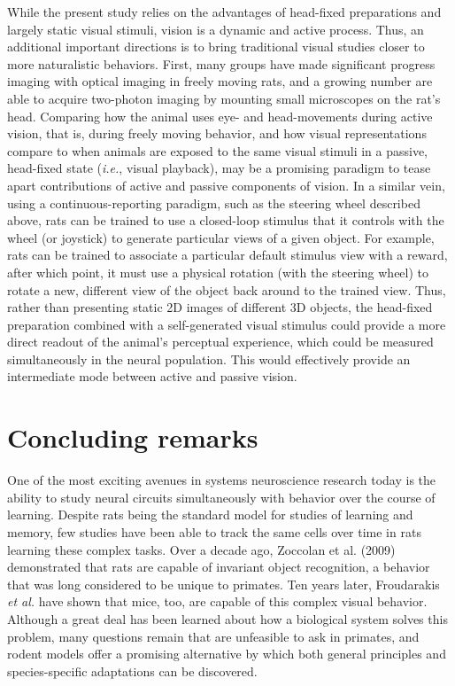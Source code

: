 While the present study relies on the advantages of head-fixed preparations and largely static visual stimuli, vision is a dynamic and active process. Thus, an additional important directions is to bring traditional visual studies closer to more naturalistic behaviors. First, many groups have made significant progress imaging with optical imaging in freely moving rats, and a growing number are able to acquire two-photon imaging by mounting small microscopes on the rat's head. Comparing how the animal uses eye- and head-movements during active vision, that is, during freely moving behavior, and how visual representations compare to when animals are exposed to the same visual stimuli in a passive, head-fixed state (\textit{i.e.}, visual playback), may be a promising paradigm to tease apart contributions of active and passive components of vision. In a similar vein, using a continuous-reporting paradigm, such as the steering wheel described above, rats can be trained to use a closed-loop stimulus that it controls with the wheel (or joystick) to generate particular views of a given object. For example, rats can be trained to associate a particular default stimulus view with a reward, after which point, it must use a physical rotation (with the steering wheel) to rotate a new, different view of the object back around to the trained view. Thus, rather than presenting static 2D images of different 3D objects, the head-fixed preparation combined with a self-generated visual stimulus could provide a more direct readout of the animal's perceptual experience, which could be measured simultaneously in the neural population. This would effectively provide an intermediate mode between active and passive vision.

\section{Concluding remarks}
One of the most exciting avenues in systems neuroscience research today is the ability to study neural circuits simultaneously with behavior over the course of learning. Despite rats being the standard model for studies of learning and memory, few studies have been able to track the same cells over time in rats learning these complex tasks. Over a decade ago, Zoccolan et al. (2009) demonstrated that rats are capable of invariant object recognition, a behavior that was long considered to be unique to primates. Ten years later, Froudarakis \textit{et al.} have shown that mice, too, are capable of this complex visual behavior\cite{Froudarakis2020}. Although a great deal has been learned about how a biological system solves this problem, many questions remain that are unfeasible to ask in primates, and rodent models offer a promising alternative by which both general principles and species-specific adaptations can be discovered. 

